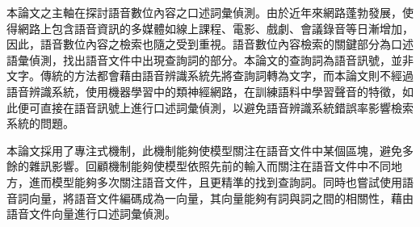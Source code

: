 \begin{zhAbstract}  %
本論文之主軸在探討語音數位內容之口述詞彙偵測。由於近年來網路蓬勃發展，使得網路上包含語音資訊的多媒體如線上課程、電影、戲劇、會議錄音等日漸增加，因此，語音數位內容之檢索也隨之受到重視。語音數位內容檢索的關鍵部分為口述語彙偵測，找出語音文件中出現查詢詞的部分。本論文的查詢詞為語音訊號，並非文字。傳統的方法都會藉由語音辨識系統先將查詢詞轉為文字，而本論文則不經過語音辨識系統，使用機器學習中的類神經網路，在訓練語料中學習聲音的特徵，如此便可直接在語音訊號上進行口述詞彙偵測，以避免語音辨識系統錯誤率影響檢索系統的問題。

本論文採用了專注式機制，此機制能夠使模型關注在語音文件中某個區塊，避免多餘的雜訊影響。回顧機制能夠使模型依照先前的輸入而關注在語音文件中不同地方，進而模型能夠多次關注語音文件，且更精準的找到查詢詞。同時也嘗試使用語音詞向量，將語音文件編碼成為一向量，其向量能夠有詞與詞之間的相關性，藉由語音文件向量進行口述詞彙偵測。
\end{zhAbstract}

{
\mysinglespacing\selectfont
\tableofcontents %

\listoffigures  %

\listoftables  %
\par
}

\newpage
\setcounter{page}{1}
